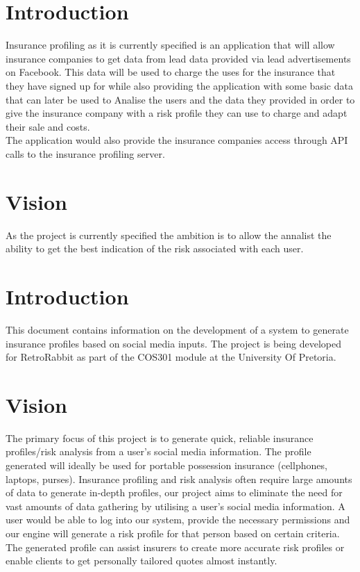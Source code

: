 \documentclass{article}
\begin{document}
\section{Introduction}

	Insurance profiling as it is currently specified is an application that will allow insurance companies to get data from lead data provided via lead advertisements on Facebook. This data will be used to charge the uses for the insurance that they have signed up for while also providing the application with some basic data that can later be used to Analise the users and the data they provided in order to give the insurance company with a risk profile they can use to charge and adapt their sale and costs.\\

	The application would also provide the insurance companies access through API calls to the insurance profiling server. 

\section{Vision}

	As the project is currently specified the ambition is to allow the annalist the ability to get the best indication of the risk associated with each user. 


\section{Introduction}
This document contains information on the development of a system to generate insurance profiles based on social media inputs. The project is being developed for RetroRabbit as part of the COS301 module at the University Of Pretoria.
\section{Vision}
The primary focus of this project is to generate quick, reliable insurance profiles/risk analysis from a user's social media information. The profile generated will ideally be used for portable possession insurance (cellphones, laptops, purses). Insurance profiling and risk analysis often require large amounts of data to generate in-depth profiles, our project aims to eliminate the need for vast amounts of data gathering by utilising a user's social media information. A user would be able to log into our system, provide the necessary permissions and our engine will generate a risk profile for that person based on certain criteria. The generated profile can assist insurers to create more accurate risk profiles or enable clients to get personally tailored quotes almost instantly.
\end{document}
